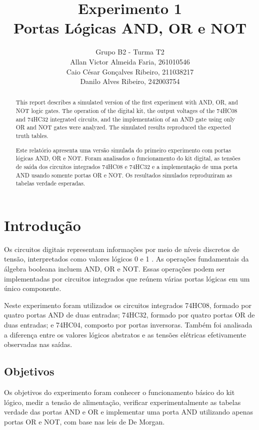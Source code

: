 \documentclass[12pt]{article}
\title{Experimento 1\\
Portas Lógicas AND, OR e NOT}
\author{Grupo B2 - Turma T2\\
        Allan Victor Almeida Faria, 261010546\\
        Caio César Gonçalves Ribeiro, 211038217\\
        Danilo Alves Ribeiro, 242003754}
\newenvironment{resumo}
        {\renewcommand{\abstractname}{Resumo}\begin{abstract}}
        {\end{abstract}}
\begin{document}
\maketitle

\renewcommand{\abstractname}{Abstract}
\begin{abstract}
This report describes a simulated version of the first experiment with AND,
OR, and NOT logic gates. The operation of the digital kit, the output voltages
of the 74HC08 and 74HC32 integrated circuits, and the implementation of an AND
gate using only OR and NOT gates were analyzed. The simulated results reproduced
the expected truth tables.
\end{abstract}

\begin{resumo}
Este relatório apresenta uma versão simulada do primeiro experimento com portas
lógicas AND, OR e NOT. Foram analisados o funcionamento do kit digital, as
tensões de saída dos circuitos integrados 74HC08 e 74HC32 e a implementação de
uma porta AND usando somente portas OR e NOT. Os resultados simulados reproduziram
as tabelas verdade esperadas. 
\end{resumo}

\section{Introdução}
\label{sec:introducao}

Os circuitos digitais representam informações por meio de níveis discretos de
tensão, interpretados como valores lógicos 0 e 1 \cite{wakerly90}. As operações fundamentais da
álgebra booleana incluem AND, OR e NOT. Essas operações podem ser implementadas
por circuitos integrados que reúnem várias portas lógicas em um único componente.

Neste experimento foram utilizados os circuitos integrados 74HC08, formado por
quatro portas AND de duas entradas; 74HC32, formado por quatro portas OR de duas
entradas; e 74HC04, composto por portas inversoras. Também foi analisada a
diferença entre os valores lógicos abstratos e as tensões elétricas efetivamente
observadas nas saídas.

\subsection{Objetivos}
\label{sec:objetivos}

Os objetivos do experimento foram conhecer o funcionamento básico do kit lógico,
medir a tensão de alimentação, verificar experimentalmente as tabelas verdade das
portas AND e OR e implementar uma porta AND utilizando apenas portas OR e NOT,
com base nas leis de De Morgan.
\end{document}
